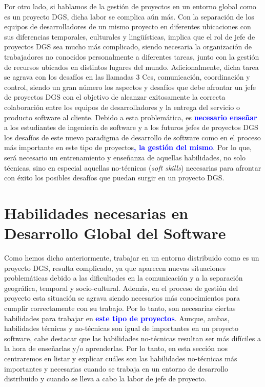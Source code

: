 Por otro lado, si hablamos de la gestión de proyectos en un entorno global como es un proyecto DGS, dicha labor se complica aún más. Con la separación de los equipos de desarrolladores de un mismo proyecto en diferentes ubicaciones con sus diferencias temporales, culturales y lingüísticas, implica que el rol de jefe de proyectos DGS sea mucho más complicado, siendo necesaria la organización de trabajadores no conocidos personalmente a diferentes tareas, junto con la gestión de recursos ubicados en distintos lugares del mundo. Adicionalmente, dicha tarea se agrava con los desafíos en las llamadas 3 Ces, comunicación, coordinación y control, siendo un gran número los aspectos y desafíos que debe afrontar un jefe de proyectos DGS con el objetivo de alcanzar exitosamente la correcta colaboración entre los equipos de desarrolladores y la entrega del servicio o producto software al cliente. Debido a esta problemática, es \textbf{\textcolor{blue}{necesario enseñar}} a los estudiantes de ingeniería de software y a los futuros jefes de proyectos DGS los desafíos de este nuevo paradigma de desarrollo de software como en el proceso más importante en este tipo de proyectos\textbf{\textcolor{blue}{, la gestión del mismo}}. Por lo que, será necesario un entrenamiento y enseñanza de aquellas habilidades, no solo técnicas, sino en especial aquellas no-técnicas (\emph{soft skills}) necesarias para afrontar con éxito los posibles desafíos que puedan surgir en un proyecto DGS.

\section{Habilidades necesarias en Desarrollo Global del Software}
\label{sec:HabilidadesDGS}

Como hemos dicho anteriormente, trabajar en un entorno distribuido como es un proyecto DGS, resulta complicado, ya que aparecen nuevas situaciones problemáticas debido a las dificultades en la comunicación y a la separación geográfica, temporal y socio-cultural. Además, en el proceso de gestión del proyecto esta situación se agrava siendo necesarios más conocimientos para cumplir correctamente con su trabajo. Por lo tanto, son necesarias ciertas habilidades para trabajar en \textbf{\textcolor{blue}{este tipo de proyectos}}. Aunque, ambas, habilidades técnicas y no-técnicas son igual de importantes en un proyecto software, cabe destacar que las habilidades no-técnicas resultan ser más difíciles a la hora de enseñarlas y/o aprenderlas. Por lo tanto, en esta sección nos centraremos en listar y explicar cuáles son las habilidades no-técnicas más importantes y necesarias cuando se trabaja en un entorno de desarrollo distribuido y cuando se lleva a cabo la labor de jefe de proyecto.

